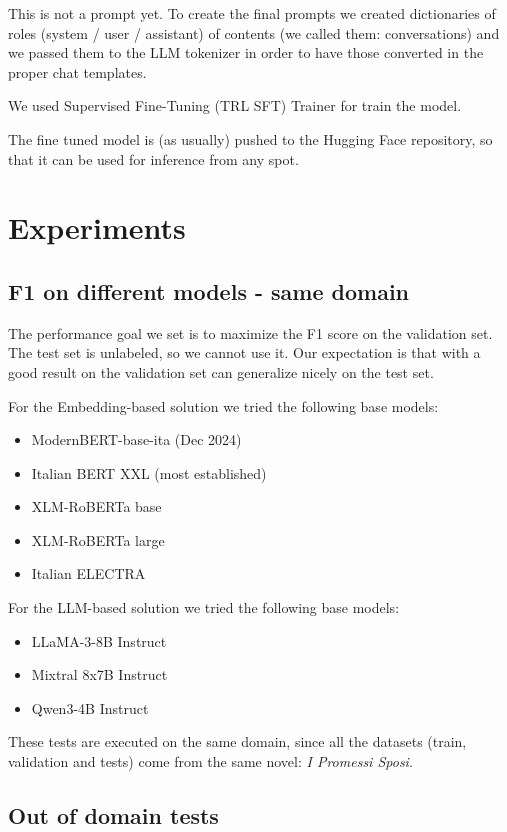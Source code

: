 \documentclass[11pt]{article}
\begin{document}
 This is not a prompt yet.  To create the final prompts we created dictionaries of roles (system / user / assistant) of contents (we called them: conversations) and we passed them to the LLM tokenizer in order to have those converted in the proper chat templates. 
 
 We used  Supervised Fine-Tuning (TRL SFT) Trainer for train the model.

The fine tuned model is (as usually) pushed to the Hugging Face repository, so that it can be used
for inference from any spot.

\section{Experiments}

\subsection{F1 on different models - same domain}

The performance goal we set is to maximize the F1 score on the validation set. The test set is unlabeled, so we cannot use it. Our expectation is that with a good result on the
validation set can generalize nicely on the test set.

For the Embedding-based solution we tried the following base models:

 \begin{itemize}
	\item ModernBERT-base-ita (Dec 2024)
	\item Italian BERT XXL (most established)
	\item XLM-RoBERTa base
	\item XLM-RoBERTa large
	\item Italian ELECTRA
\end{itemize}

For the LLM-based solution we tried the following base models:

 \begin{itemize}
	\item LLaMA-3-8B Instruct
	\item Mixtral 8x7B Instruct
	\item Qwen3-4B Instruct
\end{itemize}

These tests are executed on the same domain, since all the datasets (train, validation and tests) 
come from the same novel: \emph{I Promessi Sposi}. 

\subsection{Out of domain tests}
\end{document}

